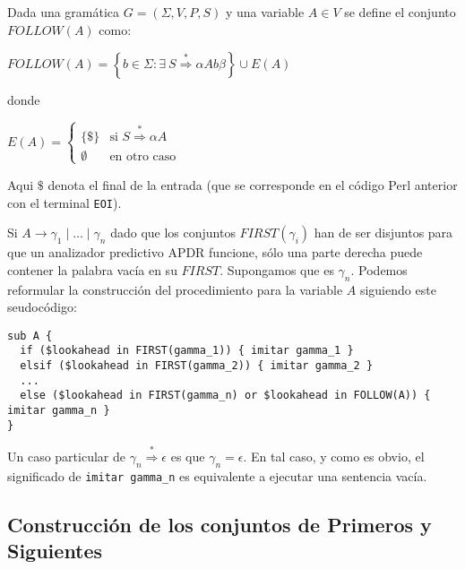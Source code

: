 \begin{definition}
Dada una gramática $G=(\Sigma,V,P,S)$ y una variable $A \in V$ 
se define el conjunto $FOLLOW(A)$ como: 

$FOLLOW(A) = \left \{ b \in \Sigma :  \exists\ S  \stackrel{*}{\Longrightarrow}  \alpha A b \beta \right \} \cup E(A)$

\noindent donde

$E(A) = \left \{ \begin{array}{ll}
                         \{ \$  \}& \mbox{si $S \stackrel{*}{\Longrightarrow} \alpha A$} \\
                         \emptyset & \mbox{en otro caso} 
                      \end{array}
             \right. $ 

\end{definition}
Aqui $\$$ denota el final de la entrada (que se corresponde en el código Perl anterior 
con el terminal \verb|EOI|).

Si $A \rightarrow \gamma_1 \mid \ldots \mid \gamma_n$ dado que los conjuntos $FIRST(\gamma_i)$ 
han de ser disjuntos para que un analizador predictivo APDR funcione, sólo una parte derecha
puede contener la palabra vacía en su $FIRST$. Supongamos que es $\gamma_n$.
Podemos reformular la construcción del procedimiento para la variable $A$ siguiendo
este seudocódigo:

\begin{verbatim}
sub A {
  if ($lookahead in FIRST(gamma_1)) { imitar gamma_1 }
  elsif ($lookahead in FIRST(gamma_2)) { imitar gamma_2 }
  ...
  else ($lookahead in FIRST(gamma_n) or $lookahead in FOLLOW(A)) { imitar gamma_n }
}
\end{verbatim}

Un caso particular de $\gamma_n \stackrel{*}{\Longrightarrow} \epsilon$ 
es que $\gamma_n = \epsilon$. En tal caso, y como
es obvio, el significado de \verb|imitar gamma_n| 
es equivalente a ejecutar una sentencia vacía.

\subsection{Construcción de los conjuntos de Primeros y Siguientes}

